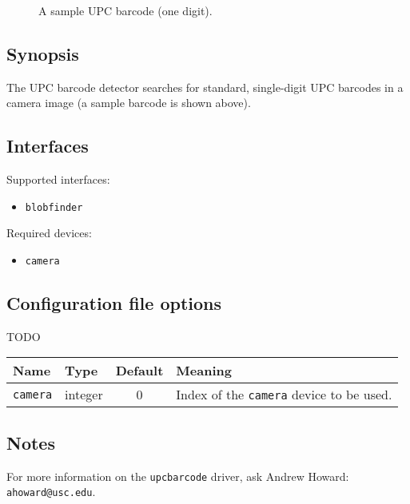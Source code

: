 
\begin{figure}[ht]
\begin{center}
\caption{A sample UPC barcode (one digit).}
\label{fig:upc}
\end{center}
\end{figure}

\subsection*{Synopsis}

The UPC barcode detector searches for standard, single-digit UPC
barcodes in a camera image (a sample barcode is shown above).


\subsection*{Interfaces}

\noindent Supported interfaces:
\begin{itemize}
\item {\tt blobfinder}
\end{itemize}

\noindent Required devices:
\begin{itemize}
\item {\tt camera}
\end{itemize}




\subsection*{Configuration file options}

TODO

\begin{center}
{\small \begin{tabularx}{\columnwidth}{|l|l|c|X|}
\hline
Name & Type & Default & Meaning\\
\hline
{\tt camera} & integer & 0 & Index of the {\tt camera} device to be used.\\
\hline
\end{tabularx}}
\end{center}

\subsection*{Notes}

For more information on the {\tt upcbarcode} driver, ask Andrew Howard:
{\tt ahoward@usc.edu}.
